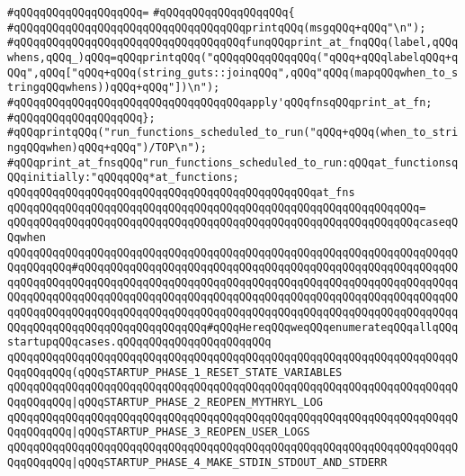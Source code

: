 \verb|#qQQqqQQqqQQqqQQqqQQq=|\newline
\verb|#qQQqqQQqqQQqqQQqqQQq{|\newline
\verb|#qQQqqQQqqQQqqQQqqQQqqQQqqQQqqQQqqQQqprintqQQq(msgqQQq+qQQq"\n");|\newline
\verb|#qQQqqQQqqQQqqQQqqQQqqQQqqQQqqQQqqQQqfunqQQqprint_at_fnqQQq(label,qQQqwhens,qQQq_)qQQq=qQQqprintqQQq("qQQqqQQqqQQqqQQq("qQQq+qQQqlabelqQQq+qQQq",qQQq["qQQq+qQQq(string_guts::joinqQQq",qQQq"qQQq(mapqQQqwhen_to_stringqQQqwhens))qQQq+qQQq"])\n");|\newline
\verb|#qQQqqQQqqQQqqQQqqQQqqQQqqQQqqQQqqQQqapply'qQQqfnsqQQqprint_at_fn;|\newline
\verb|#qQQqqQQqqQQqqQQqqQQq};|\newline
\verb|#qQQqprintqQQq("run_functions_scheduled_to_run("qQQq+qQQq(when_to_stringqQQqwhen)qQQq+qQQq")/TOP\n");|\newline
\verb|#qQQqprint_at_fnsqQQq"run_functions_scheduled_to_run:qQQqat_functionsqQQqinitially:"qQQqqQQq*at_functions;|\newline
\verb|qQQqqQQqqQQqqQQqqQQqqQQqqQQqqQQqqQQqqQQqqQQqqQQqat_fns|\newline
\verb|qQQqqQQqqQQqqQQqqQQqqQQqqQQqqQQqqQQqqQQqqQQqqQQqqQQqqQQqqQQqqQQq=|\newline
\verb|qQQqqQQqqQQqqQQqqQQqqQQqqQQqqQQqqQQqqQQqqQQqqQQqqQQqqQQqqQQqqQQqcaseqQQqwhen|\newline
\verb|qQQqqQQqqQQqqQQqqQQqqQQqqQQqqQQqqQQqqQQqqQQqqQQqqQQqqQQqqQQqqQQqqQQqqQQqqQQqqQQq#qQQqqQQqqQQqqQQqqQQqqQQqqQQqqQQqqQQqqQQqqQQqqQQqqQQqqQQqqQQqqQQqqQQqqQQqqQQqqQQqqQQqqQQqqQQqqQQqqQQqqQQqqQQqqQQqqQQqqQQqqQQqqQQqqQQqqQQqqQQqqQQqqQQqqQQqqQQqqQQqqQQqqQQqqQQqqQQqqQQqqQQqqQQqqQQqqQQqqQQqqQQqqQQqqQQqqQQqqQQqqQQqqQQqqQQqqQQqqQQqqQQqqQQqqQQqqQQqqQQqqQQqqQQqqQQqqQQqqQQqqQQqqQQqqQQqqQQqqQQq#qQQqHereqQQqweqQQqenumerateqQQqallqQQqstartupqQQqcases.qQQqqQQqqQQqqQQqqQQqqQQq|\newline
\verb|qQQqqQQqqQQqqQQqqQQqqQQqqQQqqQQqqQQqqQQqqQQqqQQqqQQqqQQqqQQqqQQqqQQqqQQqqQQqqQQq(qQQqSTARTUP_PHASE_1_RESET_STATE_VARIABLES|\newline
\verb|qQQqqQQqqQQqqQQqqQQqqQQqqQQqqQQqqQQqqQQqqQQqqQQqqQQqqQQqqQQqqQQqqQQqqQQqqQQqqQQq|\verb#|qQQqSTARTUP_PHASE_2_REOPEN_MYTHRYL_LOG#\newline
\verb|qQQqqQQqqQQqqQQqqQQqqQQqqQQqqQQqqQQqqQQqqQQqqQQqqQQqqQQqqQQqqQQqqQQqqQQqqQQqqQQq|\verb#|qQQqSTARTUP_PHASE_3_REOPEN_USER_LOGS#\newline
\verb|qQQqqQQqqQQqqQQqqQQqqQQqqQQqqQQqqQQqqQQqqQQqqQQqqQQqqQQqqQQqqQQqqQQqqQQqqQQqqQQq|\verb#|qQQqSTARTUP_PHASE_4_MAKE_STDIN_STDOUT_AND_STDERR#\newline
